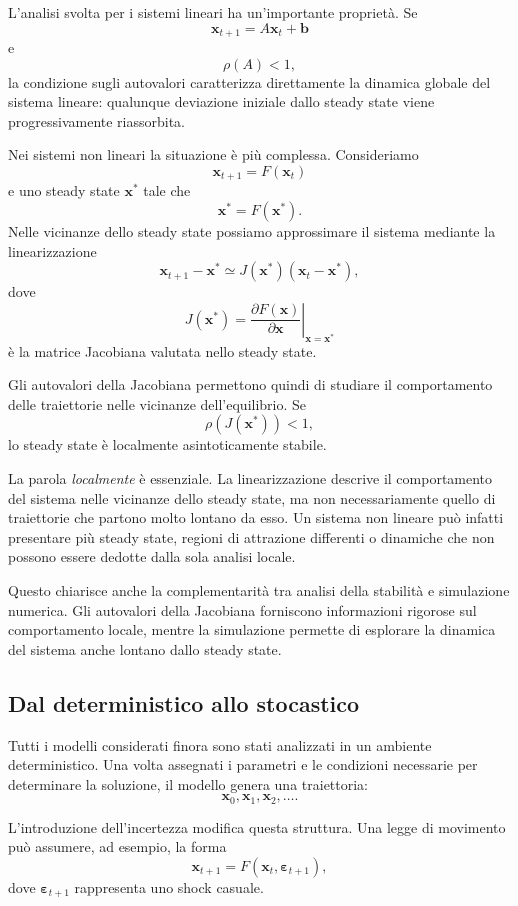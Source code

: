 \documentclass{book}
\begin{document}
L'analisi svolta per i sistemi lineari ha un'importante proprietà. Se
\[
\mathbf{x}_{t+1}=A\mathbf{x}_t+\mathbf{b}
\]
e
\[
\rho(A)<1,
\]
la condizione sugli autovalori caratterizza direttamente la dinamica
globale del sistema lineare: qualunque deviazione iniziale dallo steady
state viene progressivamente riassorbita.

Nei sistemi non lineari la situazione è più complessa. Consideriamo
\[
\mathbf{x}_{t+1}=F(\mathbf{x}_t)
\]
e uno steady state $\mathbf{x}^*$ tale che
\[
\mathbf{x}^*=F(\mathbf{x}^*).
\]
Nelle vicinanze dello steady state possiamo approssimare il sistema
mediante la linearizzazione
\[
\mathbf{x}_{t+1}-\mathbf{x}^*
\simeq
J(\mathbf{x}^*)
(\mathbf{x}_t-\mathbf{x}^*),
\]
dove
\[
J(\mathbf{x}^*)
=
\left.
\frac{\partial F(\mathbf{x})}
{\partial\mathbf{x}}
\right|_{\mathbf{x}=\mathbf{x}^*}
\]
è la matrice Jacobiana valutata nello steady state.

Gli autovalori della Jacobiana permettono quindi di studiare il
comportamento delle traiettorie nelle vicinanze dell'equilibrio. Se
\[
\rho\!\left(J(\mathbf{x}^*)\right)<1,
\]
lo steady state è localmente asintoticamente stabile.

La parola \emph{localmente} è essenziale. La linearizzazione descrive
il comportamento del sistema nelle vicinanze dello steady state, ma
non necessariamente quello di traiettorie che partono molto lontano
da esso. Un sistema non lineare può infatti presentare più steady state,
regioni di attrazione differenti o dinamiche che non possono essere
dedotte dalla sola analisi locale.

Questo chiarisce anche la complementarità tra analisi della stabilità
e simulazione numerica. Gli autovalori della Jacobiana forniscono
informazioni rigorose sul comportamento locale, mentre la simulazione
permette di esplorare la dinamica del sistema anche lontano dallo
steady state.

\subsection{Dal deterministico allo stocastico}

Tutti i modelli considerati finora sono stati analizzati in un ambiente
deterministico. Una volta assegnati i parametri e le condizioni
necessarie per determinare la soluzione, il modello genera una
traiettoria:
\[
\mathbf{x}_0,
\mathbf{x}_1,
\mathbf{x}_2,
\ldots.
\]

L'introduzione dell'incertezza modifica questa struttura. Una legge di
movimento può assumere, ad esempio, la forma
\[
\mathbf{x}_{t+1}
=
F(\mathbf{x}_t,\boldsymbol{\varepsilon}_{t+1}),
\]
dove $\boldsymbol{\varepsilon}_{t+1}$ rappresenta uno shock casuale.
\end{document}
